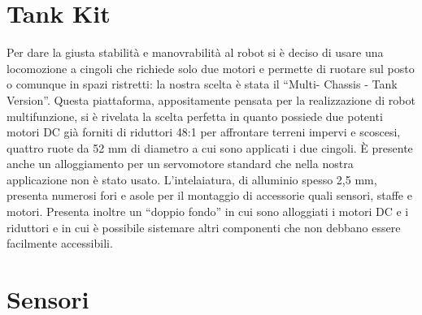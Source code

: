 \section {Tank Kit}
Per dare la giusta stabilità e manovrabilità al robot si è deciso di usare una
locomozione a cingoli che richiede solo due motori e permette di ruotare sul 
posto o comunque in spazi ristretti: la nostra scelta è stata il ``Multi-
Chassis - Tank Version''. Questa piattaforma, appositamente pensata per la 
realizzazione di robot multifunzione, si è rivelata la scelta perfetta in 
quanto possiede due potenti motori DC già forniti di riduttori 48:1 per 
affrontare terreni impervi e scoscesi, quattro ruote da 52 mm di diametro a 
cui sono applicati i due cingoli. È presente anche un alloggiamento per un 
servomotore standard che nella nostra applicazione non è stato usato. 
L'intelaiatura, di alluminio spesso 2,5 mm, presenta numerosi fori e asole
per il montaggio di accessorie quali sensori, staffe e motori. Presenta
inoltre un ``doppio fondo'' in cui sono alloggiati i motori DC e i riduttori 
e in cui è possibile sistemare altri componenti che non debbano essere 
facilmente accessibili.
\section {Sensori}
